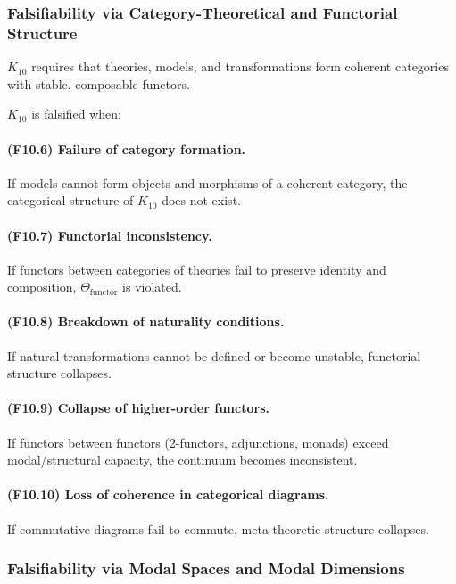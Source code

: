 \subsubsection{Falsifiability via Category-Theoretical and Functorial Structure}

$K_{10}$ requires that theories, models, and transformations form coherent
categories with stable, composable functors.

$K_{10}$ is falsified when:

\paragraph{(F10.6) Failure of category formation.}
If models cannot form objects and morphisms of a coherent category,
the categorical structure of $K_{10}$ does not exist.

\paragraph{(F10.7) Functorial inconsistency.}
If functors between categories of theories fail to preserve identity
and composition, $\Theta_{\mathrm{functor}}$ is violated.

\paragraph{(F10.8) Breakdown of naturality conditions.}
If natural transformations cannot be defined or become unstable,
functorial structure collapses.

\paragraph{(F10.9) Collapse of higher-order functors.}
If functors between functors (2-functors, adjunctions, monads)
exceed modal/structural capacity, the continuum becomes inconsistent.

\paragraph{(F10.10) Loss of coherence in categorical diagrams.}
If commutative diagrams fail to commute,
meta-theoretic structure collapses.



\subsubsection{Falsifiability via Modal Spaces and Modal Dimensions}

